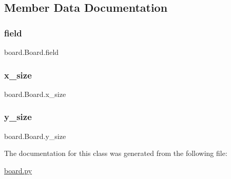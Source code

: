 \subsection{Member Data Documentation}
\mbox{\label{classboard_1_1_board_aba360fdddf89e1cc92bfd0dc98233b74}} 
\subsubsection{\texorpdfstring{field}{field}}
{\footnotesize\ttfamily board.\+Board.\+field}

\mbox{\label{classboard_1_1_board_a7fed89e2d304ae0a8e3579279e3fdf13}} 
\subsubsection{\texorpdfstring{x\_size}{x\_size}}
{\footnotesize\ttfamily board.\+Board.\+x\+\_\+size}

\mbox{\label{classboard_1_1_board_a753e98035a83120eb1aa26c227a53c9b}} 
\subsubsection{\texorpdfstring{y\_size}{y\_size}}
{\footnotesize\ttfamily board.\+Board.\+y\+\_\+size}



The documentation for this class was generated from the following file\+:\begin{DoxyCompactItemize}
\item 
\mbox{\hyperlink{board_8py}{board.\+py}}\end{DoxyCompactItemize}
